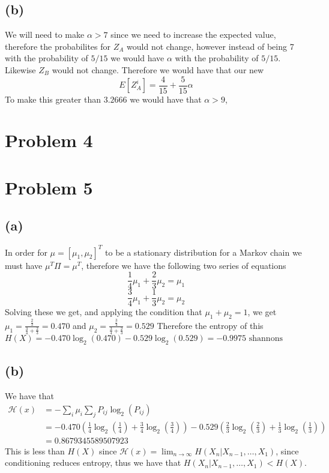 \subsection*{(b)}
We will need to make $\alpha>7$ since we need to increase the expected value,
therefore the probabilites for $Z_A$ would not change, however instead 
of being 7 with the probability of $5/15$ we would have $\alpha$ with the
probability of $5/15$. Likewise $Z_B$ would not change. Therefore we would have that
our new 
$$E[Z_A^i]=\frac{4}{15}+\frac{5}{15}\alpha$$
To make this greater than $3.2666$ we would have that
$\boxed{\alpha>9}$, 
\section*{Problem 4}
\section*{Problem 5}
\subsection*{(a)}
In order for $\mu=[\mu_1,\mu_2]^T$ to be a stationary distribution for 
a Markov chain we must have $\mu^T\Pi=\mu^T$, therefore we have the 
following two series of equations
$$\frac{1}{4}\mu_1+\frac{2}{3}\mu_2=\mu_1$$
$$\frac{3}{4}\mu_1+\frac{1}{3}\mu_2=\mu_2$$
Solving these we get, and applying the condition that $\mu_1+\mu_2=1$,
we get $\mu_1=\frac{\frac{2}{3}}{\frac{3}{4}+\frac{2}{3}}=\boxed{0.470}$ and
$\mu_2=\frac{\frac{3}{4}}{\frac{3}{4}+\frac{2}{3}}=\boxed{0.529}$ Therefore the 
entropy of this $H(X)=-0.470\log_2(0.470)-0.529\log_2(0.529)=\boxed{-0.9975\text{ shannons}}$
\subsection*{(b)}
We have that 
\begin{align*}
    \mathcal{H}(x)&=-\sum_{i}\mu_i\sum_{j}P_{ij}\log_2(P_{ij})\\
    &=-0.470\left(\frac{1}{4}\log_2\left(\frac{1}{4}\right)+
    \frac{3}{4}\log_2\left(\frac{3}{4}\right)\right)-0.529\left(\frac{2}{3}\log_2\left(\frac{2}{3}\right)+
    \frac{1}{3}\log_2\left(\frac{1}{3}\right)\right)\\
    &=\boxed{0.8679345589507923}
\end{align*}
This is less than $H(X)$ since 
$\mathcal{H}(x)=\lim_{n\to\infty}H(X_n|X_{n-1},\dots,X_1)$, 
since conditioning reduces entropy, thus we have that 
$H(X_n|X_{n-1},\dots,X_1)<H(X)$.
